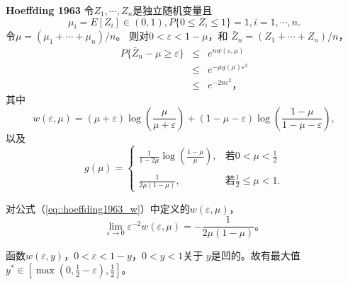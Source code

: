 \begin{theorem}{\bf Hoeffding 1963}
  令$Z_1, \cdots, Z_n$是独立随机变量且
  $$
  \mu_i = E[Z_i] \in (0, 1), P\{0 \leq Z_i \leq 1\} = 1, i = 1, \cdots, n.
  $$
  令$\mu = (\mu_1 + \cdots + \mu_n) / n$。 则对$0 < \varepsilon < 1 -\mu$，和
  $\bar{Z}_n = (Z_1 + \cdots + Z_n) / n$，
  \begin{eqnarray}
    P\{\bar{Z}_n - \mu \geq \varepsilon\} &\leq& e^{n w(\varepsilon, \mu)} \\
    \label{eq::hoeffding1963_1}
    & \leq & e^{-\mu g(\mu) \varepsilon^2} \\
    \label{eq::hoeffding1963_2}
    & \leq & e^{-2 n \varepsilon^2}，
    \label{eq::hoeffding1963_3}
  \end{eqnarray}
  其中
  \begin{equation}
    w(\varepsilon, \mu) = (\mu + \varepsilon) \log
    \left(\frac{\mu}{\mu + \varepsilon}\right) + (1 - \mu -
    \varepsilon) \log\left(\frac{1 - \mu}{1 - \mu - \varepsilon}\right),
    \label{eq::hoeffding1963_w}
  \end{equation}
  以及
  \begin{equation}
    g(\mu) =
    \left\{
        \begin{array}{ll}
          \displaystyle \frac{1}{1 - 2 \mu} \log\left(\frac{1 -
            \mu}{\mu}\right),& \mbox{若} 0 < \mu <
          \frac{1}{2}\\\\ \displaystyle \frac{1}{2\mu(1 - \mu)},&
          \mbox{若} \frac{1}{2} \leq \mu < 1.
        \end{array}\right.
        \label{eq::hoeffding1963_g}
  \end{equation}
  \label{thm::Hoeffding1963}
\end{theorem}

\begin{corollary}
  对公式（\ref{eq::hoeffding1963_w}）中定义的$w(\varepsilon, \mu)$，
  \begin{equation}
    \lim_{\varepsilon \to 0} \varepsilon^{-2} w(\varepsilon, \mu) =
    -\frac{1}{2\mu(1 - \mu)}。
  \end{equation}
  \label{cor::hoeff_1}
\end{corollary}

\begin{corollary}
  函数$w(\varepsilon, y)$，$0 < \varepsilon < 1 - y$，$0 < y < 1$关于
  $y$是凹的。故有最大值$y^* \in [\max(0, \frac{1}{2} - \varepsilon),
    \frac{1}{2}]$。
  \label{cor::hoeff_2}
\end{corollary}

